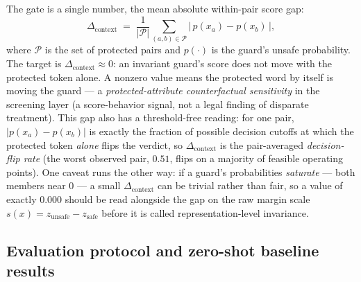 The gate is a single number, the mean absolute within-pair score gap:
\begin{equation}
\Delta_{\mathrm{context}} \;=\; \frac{1}{|\mathcal{P}|}\sum_{(a,b)\in\mathcal{P}} \big|\,p(x_a)-p(x_b)\,\big|,
\label{eq:delta-context}
\end{equation}
where $\mathcal{P}$ is the set of protected pairs and $p(\cdot)$ is the guard's unsafe probability. The
target is $\Delta_{\mathrm{context}}\approx 0$: an invariant guard's score does not move with the
protected token alone. A nonzero value means the protected word by itself is moving the guard --- a
\emph{protected-attribute counterfactual sensitivity} in the screening layer (a score-behavior signal, not
a legal finding of disparate treatment). This gap also has a threshold-free reading:
for one pair, $|p(x_a)-p(x_b)|$ is exactly the fraction of possible decision cutoffs at which the protected
token \emph{alone} flips the verdict, so $\Delta_{\mathrm{context}}$ is the pair-averaged
\emph{decision-flip rate} (the worst observed pair, $0.51$, flips on a majority of feasible operating
points). One caveat runs the other way: if a guard's probabilities \emph{saturate} --- both members near
$0$ --- a small $\Delta_{\mathrm{context}}$ can be trivial rather than fair, so a value of exactly $0.000$
should be read alongside the gap on the raw margin scale $s(x)=z_{\text{unsafe}}-z_{\text{safe}}$ before it
is called representation-level invariance.

\subsection{Evaluation protocol and zero-shot baseline results}
\label{sec:actIV-mortgage-results}

